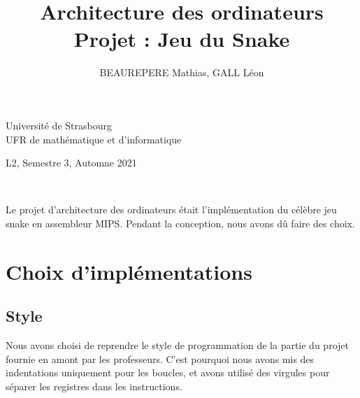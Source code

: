 \documentclass[a4paper]{article}
\title{Architecture des ordinateurs\\\large Projet : Jeu du Snake}
\author{BEAUREPERE Mathias, GALL Léon}
\date{}
\begin{document}
\hspace{-0.5cm}\begin{minipage}{0.5\textwidth}
Université de Strasbourg\\
UFR de mathématique et d'informatique
\end{minipage}
\hspace*{\fill}\begin{minipage}{0.5\textwidth}
\hspace*{\fill}L2, Semestre 3, Automne 2021\\
\hspace*{\fill}\@author
\end{minipage}
\\
\begin{center}
  \huge \@title
\end{center}
\vspace*{1cm}


Le projet d'architecture des ordinateurs était l'implémentation du célèbre jeu snake en assembleur MIPS.
Pendant la conception, nous avons dû faire des choix.

\section{Choix d'implémentations}

\subsection{Style}
Nous avons choisi  de reprendre le style de programmation de la partie du projet fournie en amont par les professeurs.
C'est pourquoi nous avons mis des indentations uniquement pour les boucles, et avons utilisé des virgules
pour séparer les registres dans les instructions.
\end{document}
